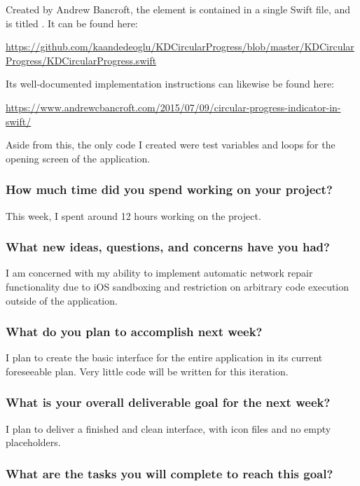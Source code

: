 \documentclass[letterpaper]{article}            %
\begin{document}
Created by Andrew Bancroft, the element is contained in a single Swift file, and is titled . It can be found here:

\url{https://github.com/kaandedeoglu/KDCircularProgress/blob/master/KDCircularProgress/KDCircularProgress.swift}

Its well-documented implementation instructions can likewise be found here:

\url{https://www.andrewcbancroft.com/2015/07/09/circular-progress-indicator-in-swift/}

Aside from this, the only code I created were test variables and  loops for the opening screen of the application.

\subsubsection{How much time did you spend working on your project?}

This week, I spent around 12 hours working on the project.

\subsubsection{What new ideas, questions, and concerns have you had?}

I am concerned with my ability to implement automatic network repair functionality due to iOS sandboxing and restriction on arbitrary code execution outside of the application.

\subsubsection{What do you plan to accomplish next week?}

I plan to create the basic interface for the entire application in its current foreseeable plan. Very little code will be written for this iteration.

\subsubsection{What is your overall deliverable goal for the next week?}

I plan to deliver a finished and clean interface, with icon files and no empty placeholders.

\subsubsection{What are the tasks you will complete to reach this goal?}
\end{document}
